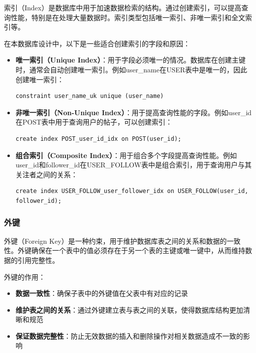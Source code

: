 索引（Index）是数据库中用于加速数据检索的结构。通过创建索引，可以提高查询性能，特别是在处理大量数据时。索引类型包括唯一索引、非唯一索引和全文索引等。

在本数据库设计中，以下是一些适合创建索引的字段和原因：

\begin{itemize}
    \item \textbf{唯一索引（Unique Index）}：用于字段必须唯一的情况。数据库在创建主键时，通常会自动创建唯一索引。例如user\_name在USER表中是唯一的，因此创建唯一索引：
          \begin{verbatim}
constraint user_name_uk unique (user_name)
          \end{verbatim}
    \item \textbf{非唯一索引（Non-Unique Index）}：用于提高查询性能的字段。例如user\_id在POST表中用于查询用户的帖子，可以创建索引：
          \begin{verbatim}
create index POST_user_id_idx on POST(user_id);
          \end{verbatim}
    \item \textbf{组合索引（Composite Index）}：用于组合多个字段提高查询性能。例如user\_id和follower\_id在USER\_FOLLOW表中是组合索引，用于查询用户与其关注者之间的关系：
          \begin{verbatim}
create index USER_FOLLOW_user_follower_idx on USER_FOLLOW(user_id, follower_id);
          \end{verbatim}
\end{itemize}

\subsubsection{外键}

外键（Foreign Key）是一种约束，用于维护数据库表之间的关系和数据的一致性。外键确保在一个表中的值必须存在于另一个表的主键或唯一键中，从而维持数据的引用完整性。

外键的作用：

\begin{itemize}
    \item \textbf{数据一致性}：确保子表中的外键值在父表中有对应的记录
    \item \textbf{维护表之间的关系}：通过外键建立表与表之间的关联，使得数据库结构更加清晰和规范
    \item \textbf{保证数据完整性}：防止无效数据的插入和删除操作对相关数据造成不一致的影响
\end{itemize}

